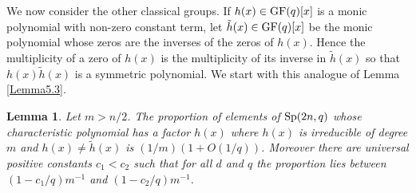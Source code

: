 \documentclass[12pt]{article}
\newtheorem{lemma}[definition]{Lemma}
\def\GF{{\rm GF}}
\def\Sp{{\rm Sp}}
\begin{document}
We now consider 
the other classical  groups. If $h(x)\in\GF(q)[x]$ is a
monic polynomial with non-zero constant term, let
$\tilde{h}(x)\in\GF(q)[x]$ be the monic polynomial  whose zeros are the
inverses of the zeros of $h(x)$. Hence the multiplicity of a zero of
$h(x)$ is the multiplicity of its inverse in $\tilde{h}(x)$ so that
$h(x)\tilde{h}(x)$ is a symmetric  polynomial.  We start with this
analogue of Lemma \ref{Lemma5.3}.

\begin{lemma}\label{Lemma5.8} Let $m>n/2$. 
The proportion of elements of
$\Sp(2n,q)$ whose characteristic polynomial has a factor $h(x)$ where
$h(x)$ is irreducible of degree $m$ and $h(x)\ne \tilde{h}(x)$ is
$(1/m)(1+O(1/q))$. Moreover there are universal positive constants
$c_1<c_2$ such that for all $d$ and $q$ the proportion lies between
$(1-c_1/q)m^{-1}$ and $(1-c_2/q)m^{-1} $.
\end{lemma}
\end{document}
